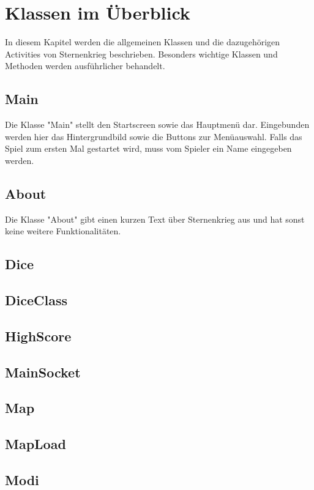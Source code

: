 \documentclass[11pt]{article} %
\begin{document}
\section{Klassen im Überblick}
In diesem Kapitel werden die allgemeinen Klassen und die dazugehörigen Activities von Sternenkrieg beschrieben. Besonders wichtige Klassen und Methoden werden ausführlicher behandelt.

\subsection{Main}
Die Klasse "Main" stellt den Startscreen sowie das Hauptmenü dar. Eingebunden werden hier das Hintergrundbild sowie die Buttons zur Menüauswahl. Falls das Spiel zum ersten Mal gestartet wird, muss vom Spieler ein Name eingegeben werden.

\subsection{About}
Die Klasse "About" gibt einen kurzen Text über Sternenkrieg aus und hat sonst keine weitere Funktionalitäten.

\subsection{Dice}

\subsection{DiceClass}

\subsection{HighScore}

\subsection{MainSocket}

\subsection{Map}

\subsection{MapLoad}

\subsection{Modi}
\end{document}
